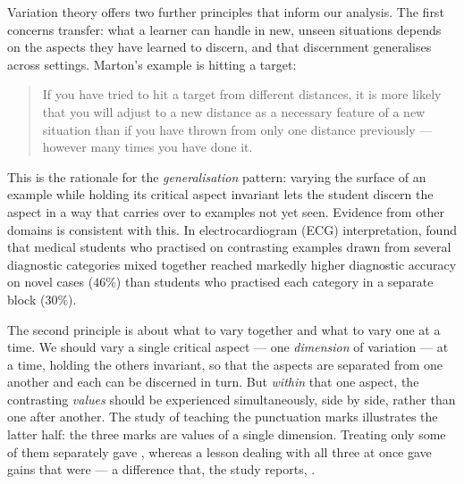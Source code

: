 Variation theory offers two further principles that inform our analysis. The
first concerns transfer: what a learner can handle in new, unseen situations
depends on the aspects they have learned to discern, and that discernment
generalises across settings. Marton's example is hitting a target:
\blockcquote[pp.~72--73]{NCOL}{If you have tried to hit a target from different
distances, it is more likely that you will adjust to a new distance as a
necessary feature of a new situation than if you have thrown from only one
distance previously --- however many times you have done it.}
This is the rationale for the \emph{generalisation} pattern: varying the surface
of an example while holding its critical aspect invariant lets the student
discern the aspect in a way that carries over to examples not yet seen.
Evidence from other domains is consistent with this. In electrocardiogram (ECG)
interpretation, \textcite{hatala2003practice} found that medical students who
practised on contrasting examples drawn from several diagnostic categories mixed
together reached markedly higher diagnostic accuracy on novel cases (\(46\%\))
than students who practised each category in a separate block (\(30\%\)).

The second principle is about what to vary together and what to vary one at a
time. We should vary a single critical aspect --- one \emph{dimension} of
variation --- at a time, holding the others invariant, so that the aspects are
separated from one another and each can be discerned in turn. But \emph{within}
that one aspect, the contrasting \emph{values} should be experienced
simultaneously, side by side, rather than one after another. The study of
teaching the punctuation marks illustrates the latter half: the three marks are
values of a single dimension. Treating only some of them separately gave
, whereas a lesson
dealing with all three at once gave gains that were
 --- a difference that, the study
reports, .








